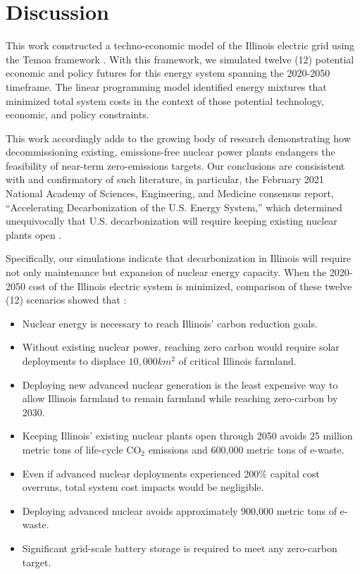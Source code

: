 \section{Discussion}\label{sec:discussion}
This work constructed a techno-economic model of the Illinois electric grid 
using the Temoa framework \cite{decarolis_modelling_2016}. With this framework, 
we simulated twelve (12) potential economic and policy futures for this energy 
system spanning the 2020-2050 timeframe. The linear programming model 
identified energy mixtures that minimized total system costs 
in the context of those potential technology, economic, and policy constraints.

This work accordingly adds to the growing body of research demonstrating how 
decommissioning existing, emissions-free nuclear power plants endangers the 
feasibility of near-term zero-emissions targets.  Our conclusions are 
consisistent with and confirmatory of such literature, in particular, the 
February 2021 National Academy of Sciences, Engineering, and Medicine consensus 
report, ``Accelerating Decarbonization of the U.S. Energy System,'' which determined unequivocally that U.S. decarbonization will require keeping existing nuclear plants open
\cite{national_academies_of_sciences_engineering_and_medicine_2021_accelerating_2021}.

Specifically, our simulations indicate that decarbonization
in Illinois will require not only maintenance but expansion of nuclear energy capacity.
When the 2020-2050 cost of the Illinois electric system is minimized, 
comparison of these twelve (12) scenarios showed that :

\begin{itemize}
        \item Nuclear energy is necessary to reach Illinois' carbon reduction
                goals.
        \item Without existing nuclear power, reaching zero carbon would
                require solar deployments to displace $10,000km^2$ of critical
                Illinois
                farmland.
        \item Deploying new advanced nuclear generation is the least expensive way to
                allow Illinois farmland to remain farmland while reaching
                zero-carbon by 2030.
        \item Keeping Illinois' existing nuclear plants open through
                2050 avoids 25 million metric tons of life-cycle CO$_2$
                emissions and 600,000 metric tons of e-waste.
        \item Even if advanced nuclear deployments experienced 200\% capital
                cost overruns, total system cost impacts would be negligible.
        \item Deploying advanced nuclear avoids approximately 900,000 metric
                tons of e-waste.
        \item Significant grid-scale battery storage is required to meet any zero-carbon
                target.
\end{itemize}
